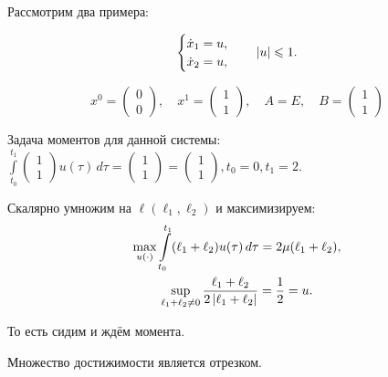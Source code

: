 Рассмотрим два примера:
\begin{ex}
	\begin{equation*}
	  \begin{cases}
	    \dot{x}_1 = u,\\
			\dot{x}_2 = u,
	  \end{cases}
		\quad \left| u \right| \leqslant 1.
	\end{equation*}
	
	\begin{equation*}
	  x^0 =
	  \begin{pmatrix}
	    0\\
	    0
	  \end{pmatrix},
	  \quad
		x^1 =
		\begin{pmatrix}
		  1\\
		  1
		\end{pmatrix},
		\quad
		A = E, \quad
		B =
		\begin{pmatrix}
		  1\\
		  1
		\end{pmatrix}
	\end{equation*}
	
	Задача моментов для данной системы: 
	$\int\limits_{t_0}^{t_1}
	  \begin{pmatrix}
	    1\\
	    1
	  \end{pmatrix}
	  u(\tau) \, d\tau =
	  \begin{pmatrix}
	    1\\
	    1
	  \end{pmatrix} =
	  \begin{pmatrix}
	    1\\
	    1
	  \end{pmatrix},
	  t_0 = 0, t_1 = 2$.

	Скалярно умножим на $\ell(\ell_1, \ell_2)$ и максимизируем:
	\begin{gather*}
	  \underset{u(\cdot)}{\max} \int\limits_{t_0}^{t_1} (\ell_1 + \ell_2) u(\tau) \, d\tau = 2 \mu (\ell_1 + \ell_2),\\
	  \sup\limits_{\ell_1 + \ell_2 \neq 0} \frac{\ell_1 + \ell_2}{2 \left| \ell_1 + \ell_2 \right|} = \frac{1}{2} = u.
	\end{gather*}
	
	То есть сидим и ждём момента. %
	
	Множество достижимости является отрезком.
\end{ex}

